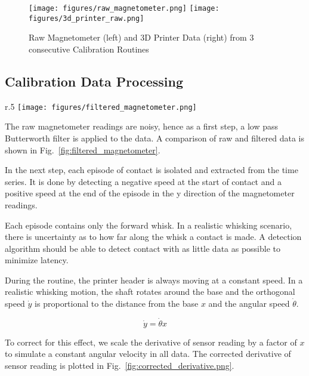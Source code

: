 \documentclass[runningheads]{llncs}
\begin{document}
\begin{figure}
    \centering
    \texttt{[image: figures/raw\_magnetometer.png]}
    \texttt{[image: figures/3d\_printer\_raw.png]}
    \caption{Raw Magnetometer (left) and 3D Printer Data (right) from 3 consecutive Calibration Routines}
    \label{fig:calibration_routine}
\end{figure}

\subsection{Calibration Data Processing}\label{sec:calibration_data_analysis}

\begin{wrapfigure}{r}{.5\textwidth}
    \centering
    \texttt{[image: figures/filtered\_magnetometer.png]}
    \caption{Raw and Filtered Magnetometer Reading in the X Axis }
    \label{fig:filtered_magnetometer}
\end{wrapfigure}

The raw magnetometer readings are noisy, hence as a first step, a low pass Butterworth filter is applied to the data. A comparison of raw and filtered data is shown in Fig.~\ref{fig:filtered_magnetometer}.

In the next step, each episode of contact is isolated and extracted from the time series. It is done by detecting a negative speed at the start of contact and a positive speed at the end of the episode in the y direction of the magnetometer readings.

Each episode contains only the forward whisk. In a realistic whisking scenario, there is uncertainty as to how far along the whisk a contact is made. A detection algorithm should be able to detect contact with as little data as possible to minimize latency.

During the routine, the printer header is always moving at a constant speed. In a realistic whisking motion, the shaft rotates around the base and the orthogonal speed \(\dot{y}\) is proportional to the distance from the base \(x\) and the angular speed \(\dot{\theta}\).

\[\dot{y} = \dot{\theta}x\]\label{eq:linear_relationship}

To correct for this effect, we scale the derivative of sensor reading by a factor of \(x\) to simulate a constant angular velocity in all data. The corrected derivative of sensor reading is plotted in Fig.~\ref{fig:corrected_derivative.png}.
\end{document}
